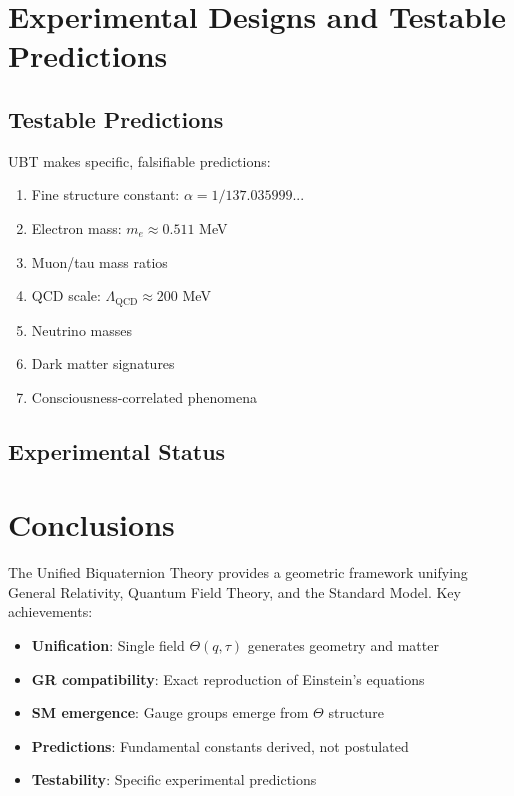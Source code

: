 \documentclass[12pt,a4paper]{article}
\begin{document}

\section{Experimental Designs and Testable Predictions}
\label{sec:experimental}


\subsection{Testable Predictions}

UBT makes specific, falsifiable predictions:

\begin{enumerate}
    \item Fine structure constant: $\alpha = 1/137.035999...$
    \item Electron mass: $m_e \approx 0.511$ MeV
    \item Muon/tau mass ratios
    \item QCD scale: $\Lambda_{\text{QCD}} \approx 200$ MeV
    \item Neutrino masses
    \item Dark matter signatures
    \item Consciousness-correlated phenomena
\end{enumerate}

\subsection{Experimental Status}



\section{Conclusions}
\label{sec:conclusions}

The Unified Biquaternion Theory provides a geometric framework unifying General Relativity, Quantum Field Theory, and the Standard Model. Key achievements:

\begin{itemize}
    \item \textbf{Unification}: Single field $\Theta(q,\tau)$ generates geometry and matter
    \item \textbf{GR compatibility}: Exact reproduction of Einstein's equations
    \item \textbf{SM emergence}: Gauge groups emerge from $\Theta$ structure
    \item \textbf{Predictions}: Fundamental constants derived, not postulated
    \item \textbf{Testability}: Specific experimental predictions
\end{itemize}
\end{document}

